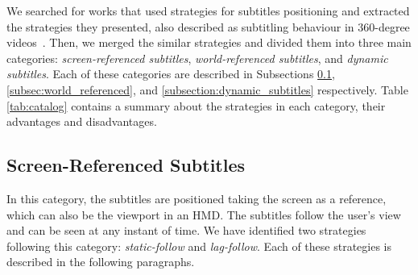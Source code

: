 We searched for works that used strategies for subtitles positioning and extracted the strategies they presented, also described as subtitling behaviour in 360-degree videos~\cite{brown_subtitles_2017}. Then, we merged the similar strategies and divided them into three main categories: \emph{screen-referenced subtitles}, \emph{world-referenced subtitles}, and \emph{dynamic subtitles}. Each of these categories are described in Subsections \ref{subsec:screen_referenced}, \ref{subsec:world_referenced}, and \ref{subsection:dynamic_subtitles} respectively. Table \ref{tab:catalog} contains a summary about the strategies in each category, their advantages and disadvantages.

\subsection{Screen-Referenced Subtitles}
\label{subsec:screen_referenced}

In this category, the subtitles are positioned taking the screen as a reference, which can also be the viewport in an HMD. The subtitles follow the user's view and can be seen at any instant of time. We have identified two strategies following this category: \emph{static-follow} and \emph{lag-follow}. Each of these strategies is described in the following paragraphs.

